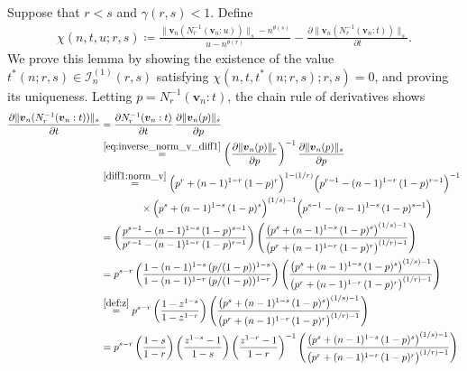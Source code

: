 \documentclass[conference, draftcls, onecolumn]{IEEEtran}
\theoremstyle{plain}
\newcommand{\bvec}[1]{\boldsymbol{#1}}
\newcommand{\lemref}[1]{Lemma~\ref{#1}}
\begin{document}
\begin{IEEEproof}[Proof of \lemref{lem:slope_v}]
Suppose that $r < s$ and $\gamma( r, s ) < 1$.
Define
\begin{align}
\chi(n, t, u; r, s)
\coloneqq
\frac{ \| \bvec{v}_{n}( N_{r}^{-1}( \bvec{v}_{n} : u )) \|_{s} - n^{\theta( s )} }{ u - n^{\theta( r )} }
-
\frac{ \partial \| \bvec{v}_{n}( N_{r}^{-1}( \bvec{v}_{n} : t ) ) \|_{s} }{ \partial t } .
\label{def:chi}
\end{align}
We prove this lemma by showing the existence of the value $t^{\ast}(n; r, s) \in \mathcal{I}_{n}^{(1)}( r, s )$ satisfying $\chi(n, t, t^{\ast}(n; r, s); r, s) = 0$, and proving its uniqueness.
Letting $p = N_{r}^{-1}( \bvec{v}_{n} : t )$, the chain rule of derivatives shows
\begin{align}
\frac{ \partial \| \bvec{v}_{n}( N_{r}^{-1}( \bvec{v}_{n} : t ) ) \|_{s} }{ \partial t }
& =
\frac{ \partial N_{r}^{-1}( \bvec{v}_{n} : t ) }{ \partial t } \, \frac{ \partial \| \bvec{v}_{n}( p ) \|_{s} }{ \partial p }
\\
& \overset{\eqref{eq:inverse_norm_v_diff1}}{=}
\bigg( \frac{ \partial \| \bvec{v}_{n}( p ) \|_{r} }{ \partial p } \bigg)^{-1} \, \frac{ \partial \| \bvec{v}_{n}( p ) \|_{s} }{ \partial p }
\\
& \overset{\eqref{diff1:norm_v}}{=}
\Big( p^{r} + (n-1)^{1-r} \, (1-p)^{r} \Big)^{1-(1/r)} \Big( p^{r-1} - (n-1)^{1-r} \, (1-p)^{r-1} \Big)^{-1}
\notag \\
& \qquad \qquad \times
\Big( p^{s} + (n-1)^{1-s} \, (1-p)^{s} \Big)^{(1/s)-1} \Big( p^{s-1} - (n-1)^{1-s} \, (1-p)^{s-1} \Big)
\\
& =
\bigg( \frac{ p^{s-1} - (n-1)^{1-s} \, (1-p)^{s-1} }{ p^{r-1} - (n-1)^{1-r} \, (1-p)^{r-1} } \bigg) \, \Bigg( \frac{ \big( p^{s} + (n-1)^{1-s} \, (1-p)^{s} \big)^{(1/s)-1} }{ \big( p^{r} + (n-1)^{1-r} \, (1-p)^{r} \big)^{(1/r)-1} } \Bigg)
\\
& =
p^{s-r} \, \bigg( \frac{ 1 - (n-1)^{1-s} \, (p/(1-p))^{1-s} }{ 1 - (n-1)^{1-r} \, (p/(1-p))^{1-r} } \bigg) \, \Bigg( \frac{ \big( p^{s} + (n-1)^{1-s} \, (1-p)^{s} \big)^{(1/s)-1} }{ \big( p^{r} + (n-1)^{1-r} \, (1-p)^{r} \big)^{(1/r)-1} } \Bigg)
\\
& \overset{\eqref{def:z}}{=}
p^{s-r} \, \bigg( \frac{ 1 - z^{1-s} }{ 1 - z^{1-r} } \bigg) \, \Bigg( \frac{ \big( p^{s} + (n-1)^{1-s} \, (1-p)^{s} \big)^{(1/s)-1} }{ \big( p^{r} + (n-1)^{1-r} \, (1-p)^{r} \big)^{(1/r)-1} } \Bigg)
\\
& =
p^{s-r} \, \bigg( \frac{ 1 - s }{ 1 - r } \bigg) \, \bigg( \frac{ z^{1-s} - 1 }{ 1 - s } \bigg) \, \bigg( \frac{ z^{1-r} - 1 }{ 1 - r } \bigg)^{-1} \, \Bigg( \frac{ \big( p^{s} + (n-1)^{1-s} \, (1-p)^{s} \big)^{(1/s)-1} }{ \big( p^{r} + (n-1)^{1-r} \, (1-p)^{r} \big)^{(1/r)-1} } \Bigg)

\end{align}
\end{IEEEproof}
\end{document}
